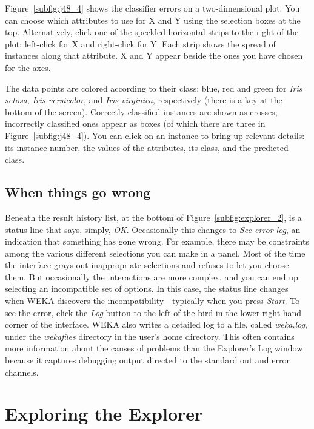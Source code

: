 Figure~\ref{subfig:j48_4} shows the classifier errors on a
two-dimensional plot. You can choose which attributes to use for X and
Y using the selection boxes at the top. Alternatively, click one of
the speckled horizontal strips to the right of the plot: left-click
for X and right-click for Y. Each strip shows the spread of instances
along that attribute. X and Y appear beside the ones you have chosen
for the axes.

The data points are colored according to their class: blue, red and
green for \textit{Iris setosa}, \textit{Iris versicolor}, and
\textit{Iris virginica}, respectively (there is a key at the bottom of
the screen). Correctly classified instances are shown as crosses;
incorrectly classified ones appear as boxes (of which there are three
in Figure~\ref{subfig:j48_4}). You can click on an instance to bring
up relevant details: its instance number, the values of the
attributes, its class, and the predicted class.

\subsection{When things go wrong}

Beneath the result history list, at the bottom of
Figure~\ref{subfig:explorer_2}, is a status line that says, simply,
\textit{OK}. Occasionally this changes to \textit{See error log}, an
indication that something has gone wrong. For example, there may be
constraints among the various different selections you can make in a
panel. Most of the time the interface grays out inappropriate
selections and refuses to let you choose them. But occasionally the
interactions are more complex, and you can end up selecting an
incompatible set of options. In this case, the status line changes
when WEKA discovers the incompatibility---typically when you press
\textit{Start}. To see the error, click the \textit{Log} button to the
left of the bird in the lower right-hand corner of the interface. WEKA
also writes a detailed log to a file, called \textit{weka.log}, under
the \textit{wekafiles} directory in the user's home directory. This
often contains more information about the causes of problems than the
Explorer's Log window because it captures debugging output directed to
the standard out and error channels.

\section{Exploring the Explorer}
\label{section:exploring_the_explorer}

